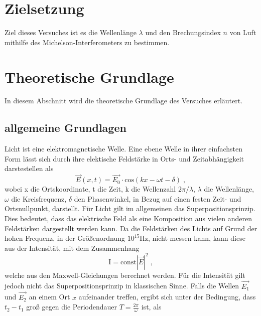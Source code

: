 \section{Zielsetzung}
    Ziel dieses Versuches ist es die Wellenlänge $\lambda$ und den Brechungsindex $n$ von Luft mithilfe des Michelson-Interferometers zu bestimmen.

\section{Theoretische Grundlage}
\noindent
In diesem Abschnitt wird die theoretische Grundlage des Versuches erläutert.  
\subsection{allgemeine Grundlagen}
Licht ist eine elektromagnetische Welle. Eine ebene Welle in ihrer einfachsten Form lässt sich durch ihre elektische Feldstärke in Orts- und Zeitabhängigkeit darstestellen als
\begin{equation}
    \vec{E}(x, t) = \vec{E_0} \cdot \text{cos}(kx - \omega t - \delta) \; , 
    \label{eqn:ansatz}
\end{equation}
\noindent
wobei x die Ortskoordinate, t die Zeit, k die Wellenzahl $2 \pi/\lambda$, $\lambda$ die Wellenlänge, $\omega$ die Kreisfrequenz, $\delta$ den Phasenwinkel, in Bezug auf einen festen Zeit- und Ortsnullpunkt, darstellt.
Für Licht gilt im allgemeinen das Superpositionsprinzip. Dies bedeutet, dass das elektrische Feld als eine Komposition aus vielen anderen Feldstärken dargestellt werden kann.
Da die Feldstärken des Lichts auf Grund der hohen Frequenz, in der Größenordnung $10^{15} \si{\hertz}$, nicht messen kann, kann diese aus der Intensität, mit dem Zusammenhang
\begin{equation*}
    \text{I} = \text{const} |\vec{E}|^2 \; ,
    \label{eqn:Int}
\end{equation*}
\noindent
welche aus den Maxwell-Gleichungen berechnet werden. Für die Intensität gilt jedoch nicht das Superpositionsprinzip in klassischen Sinne. Falls die Wellen $\vec{E_1}$ und $\vec{E_2}$ 
an einem Ort $x$  aufeinander treffen, ergibt sich unter der Bedingung, dass $t_2 - t_1$ groß gegen die Periodendauer $T = \frac{2 \pi}{\omega}$ ist, als

